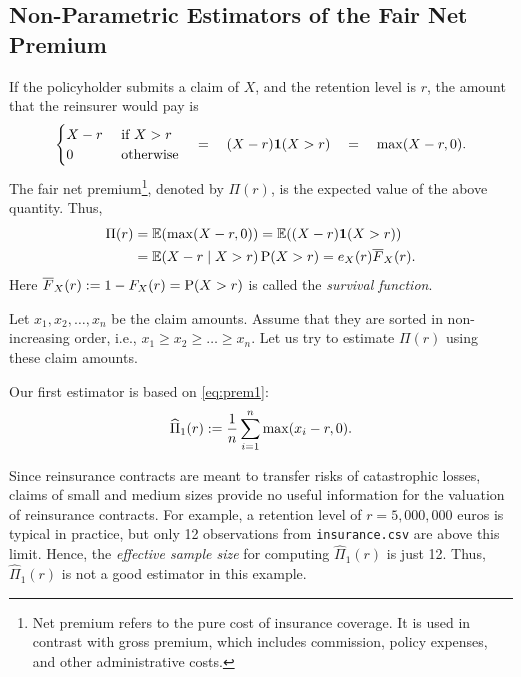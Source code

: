 \documentclass[12pt]{article}
\newcommand*{\Fbar}{\overline{F}}
\newcommand*{\Pihat}{\widehat{\Pi}}
\begin{document}

\subsection{Non-Parametric Estimators of the Fair Net Premium}
\label{sec:non-parametric}

If the policyholder submits a claim of $X$, and the retention level is $r$,
the amount that the reinsurer would pay is
\[ \begin{cases}X - r & \text{ if } X > r \\ 0 & \text{ otherwise}\end{cases}
\quad=\quad (X - r)\mathbf{1}(X > r) \quad=\quad \max(X - r, 0). \]
The fair net premium\footnote{%
Net premium refers to the pure cost of insurance coverage. It is used in contrast with gross premium,
which includes commission, policy expenses, and other administrative costs.%
}, denoted by $\Pi(r)$, is the expected value of the above quantity. Thus,
\begin{align}
\Pi(r) &= \E(\max(X - r, 0)) = \E((X-r)\boolOne(X > r))
    \label{eq:prem1}
\\ &= \E(X - r \mid X > r)\Pr(X > r) = e_X(r)\Fbar_X(r).
    \label{eq:prem2}
\end{align}
Here $\Fbar_X(r) \defeq 1 - F_X(r) = \Pr(X > r)$ is called the \emph{survival function}.

Let $x_1, x_2, \ldots, x_n$ be the claim amounts.
Assume that they are sorted in non-increasing order, i.e.,
$x_1 \ge x_2 \ge \ldots \ge x_n$.
Let us try to estimate $\Pi(r)$ using these claim amounts.

Our first estimator is based on \cref{eq:prem1}:
\begin{equation}
\label{eq:pihat1}
\Pihat_1(r) \defeq \frac{1}{n}\sum_{i=1}^n \max(x_i - r, 0).
\end{equation}

Since reinsurance contracts are meant to transfer risks of catastrophic losses, claims of
small and medium sizes provide no useful information for the valuation of reinsurance contracts.
For example, a retention level of $r = 5,000,000$ euros is typical in practice,
but only 12 observations from \texttt{insurance.csv} are above this limit.
Hence, the \emph{effective sample size} for computing $\Pihat_1(r)$ is just 12.
Thus, $\Pihat_1(r)$ is not a good estimator in this example.
\end{document}
